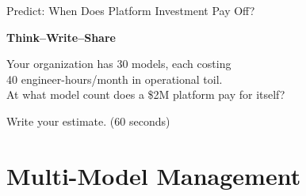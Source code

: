 \documentclass[aspectratio=169, 12pt]{beamer}
\begin{document}
\begin{frame}{Predict: When Does Platform Investment Pay Off?}

\centering
\vspace{1.0cm}
{\Large\bfseries Think--Write--Share}

\vspace{0.6cm}
{\large Your organization has 30 models, each costing\\
40 engineer-hours/month in operational toil.\\[0.3cm]
\alert{At what model count does a \$2M platform pay for itself?}}

\vspace{0.6cm}
{\normalsize Write your estimate. \textcolor{midgray}{(60 seconds)}}

\end{frame}

\section{Multi-Model Management}
\end{document}
